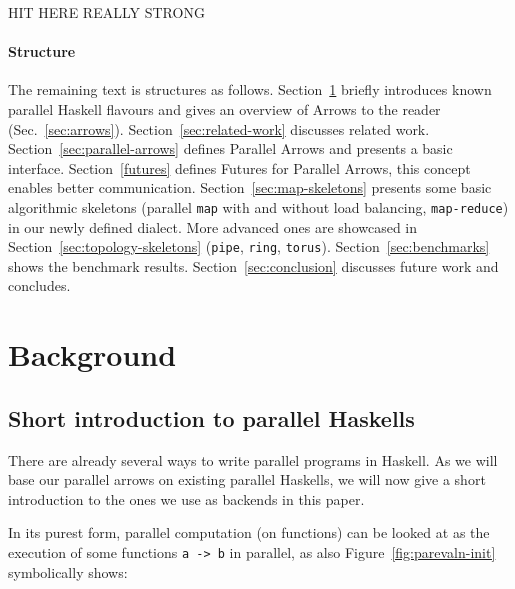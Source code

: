 \documentclass{jfp1}
\newcommand{\Varid}[1]{\mathit{#1}}
\def\resethooks{%
  \global\let\SaveRestoreHook\empty
  \global\let\ColumnHook\empty}
\let\hspre\empty
\let\hspost\empty
\newcommand{\inlinecode}[1]{\texttt{#1}}
\begin{document}
HIT HERE REALLY STRONG

\paragraph{Structure}
The remaining text is structures as follows. Section~\ref{sec:background} briefly introduces known parallel Haskell flavours and gives an overview of Arrows to the reader (Sec.~\ref{sec:arrows}). Section~\ref{sec:related-work} discusses related work. Section~\ref{sec:parallel-arrows} defines Parallel Arrows and presents a basic interface. Section~\ref{futures} defines Futures for Parallel Arrows, this concept enables better communication. Section~\ref{sec:map-skeletons} presents some basic algorithmic skeletons (parallel \inlinecode{map} with and without load balancing, \inlinecode{map-reduce}) in our newly defined dialect. More advanced ones are showcased in Section~\ref{sec:topology-skeletons} (\inlinecode{pipe}, \inlinecode{ring}, \inlinecode{torus}). Section~\ref{sec:benchmarks} shows the benchmark results. Section~\ref{sec:conclusion} discusses future work and concludes.

	\section{Background}
\label{sec:background}
\subsection{Short introduction to parallel Haskells}
There are already several ways to write parallel programs in Haskell. As we will base our parallel arrows on existing parallel Haskells, we will now give a short introduction to the ones we use as backends in this paper.

In its purest form, parallel computation (on functions) can be looked at as the execution of some functions \inlinecode{a -> b} in parallel, as also Figure~\ref{fig:parevaln-init} symbolically shows:

\resethooks
\end{document}

